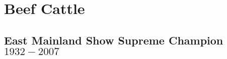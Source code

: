 \chapter{Beef Cattle}
\section[Supreme Champion]{East Mainland Show Supreme Champion $1932 - 2007$}
\small

\normalsize
